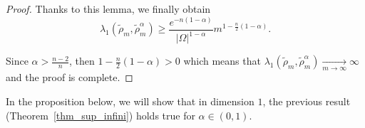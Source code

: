 \documentclass[12pt,reqno]{amsart}		%
\theoremstyle{plain}
\theoremstyle{definition}
\theoremstyle{remark}
\numberwithin{equation}{section}
\begin{document}
\begin{proof}
Thanks to this lemma, we finally obtain
\begin{equation*}
\lambda_{1}(\tilde{\rho}_{m},\tilde{\rho}_{m}^{\alpha})
\geqslant
\frac{e^{-n(1-\alpha)}}{|\Omega|^{1-\alpha}} m^{1-\frac{n}{2}(1-\alpha)}.
\end{equation*}

	Since $\alpha > \frac{n-2}{n}$, then $1-\frac{n}{2}(1-\alpha) > 0$ which means that $\lambda_{1}(\tilde{\rho}_{m},\tilde{\rho}^{\alpha}_{m})\underset{m\to\infty}{\longrightarrow} \infty$ and the proof is complete.
\end{proof}
In the proposition below, we will show that in dimension $1$, the previous result
(Theorem~\ref{thm_sup_infini}) holds true for $\alpha\in (0,1)$.
\end{document}
